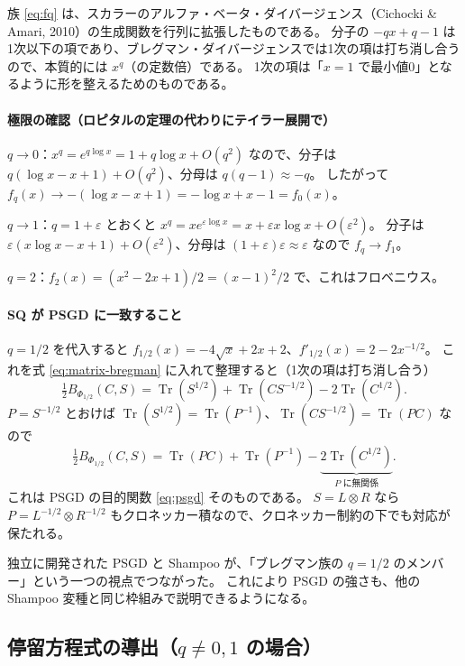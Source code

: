 \documentclass[a4paper,11pt]{ltjsarticle}
\theoremstyle{definition}
\theoremstyle{plain}
\DeclareMathOperator{\Tr}{Tr}
\begin{document}
族 \eqref{eq:fq} は、スカラーのアルファ・ベータ・ダイバージェンス（Cichocki \& Amari, 2010）の生成関数を行列に拡張したものである。
分子の $-qx+q-1$ は1次以下の項であり、ブレグマン・ダイバージェンスでは1次の項は打ち消し合うので、本質的には $x^q$（の定数倍）である。
1次の項は「$x=1$ で最小値0」となるように形を整えるためのものである。

\paragraph{極限の確認（ロピタルの定理の代わりにテイラー展開で）}
$q\to0$：$x^q = e^{q\log x} = 1 + q\log x + O(q^2)$ なので、分子は $q(\log x - x + 1) + O(q^2)$、分母は $q(q-1)\approx -q$。
したがって $f_q(x)\to -(\log x - x + 1) = -\log x + x - 1 = f_0(x)$。

$q\to1$：$q = 1+\varepsilon$ とおくと $x^q = x e^{\varepsilon\log x} = x + \varepsilon x\log x + O(\varepsilon^2)$。
分子は $\varepsilon(x\log x - x + 1) + O(\varepsilon^2)$、分母は $(1+\varepsilon)\varepsilon\approx\varepsilon$ なので $f_q\to f_1$。

$q=2$：$f_2(x) = (x^2-2x+1)/2 = (x-1)^2/2$ で、これはフロベニウス。

\paragraph{SQ が PSGD に一致すること}
$q = 1/2$ を代入すると $f_{1/2}(x) = -4\sqrt x + 2x + 2$、$f'_{1/2}(x) = 2 - 2x^{-1/2}$。
これを式 \eqref{eq:matrix-bregman} に入れて整理すると（1次の項は打ち消し合う）
\begin{equation}
  \tfrac12 B_{\Phi_{1/2}}(C, S) = \Tr(S^{1/2}) + \Tr(CS^{-1/2}) - 2\Tr(C^{1/2}).
\end{equation}
$P = S^{-1/2}$ とおけば $\Tr(S^{1/2}) = \Tr(P^{-1})$、$\Tr(CS^{-1/2}) = \Tr(PC)$ なので
\[
  \tfrac12 B_{\Phi_{1/2}}(C, S) = \Tr(PC) + \Tr(P^{-1}) - \underbrace{2\Tr(C^{1/2})}_{P\text{ に無関係}} .
\]
これは PSGD の目的関数 \eqref{eq:psgd} そのものである。
$S = L\otimes R$ なら $P = L^{-1/2}\otimes R^{-1/2}$ もクロネッカー積なので、クロネッカー制約の下でも対応が保たれる。

\begin{pointbox}[ここが新しい]
独立に開発された PSGD と Shampoo が、「ブレグマン族の $q=1/2$ のメンバー」という一つの視点でつながった。
これにより PSGD の強さも、他の Shampoo 変種と同じ枠組みで説明できるようになる。
\end{pointbox}

\subsection{停留方程式の導出（$q\neq0,1$ の場合）}
\end{document}
